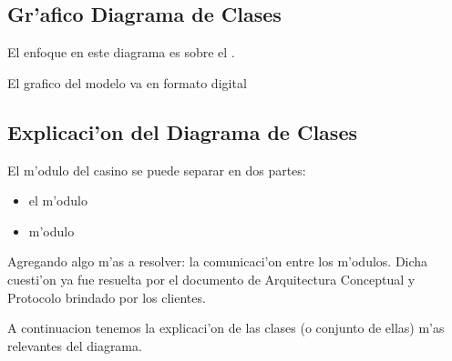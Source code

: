 \subsection{Gr'afico Diagrama de Clases}

El enfoque en este diagrama es sobre el .

El grafico del modelo va en formato digital

% 

% 

\clearpage

\subsection{Explicaci'on del Diagrama de Clases}

El m'odulo del casino se puede separar en dos partes: 

\begin{itemize}
\item el m'odulo  
\item m'odulo 
\end{itemize}  

Agregando algo m'as a resolver: la comunicaci'on entre los m'odulos. Dicha cuesti'on ya fue resuelta por el documento de Arquitectura Conceptual y Protocolo brindado por los clientes.

A continuacion tenemos la explicaci'on de las clases (o conjunto de ellas) m'as relevantes del diagrama.

